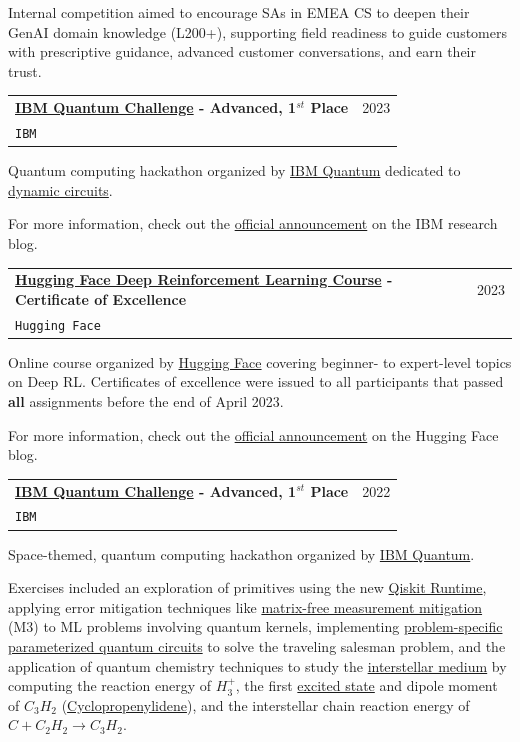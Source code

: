 \documentclass[letterpaper,11pt]{article}
\makeatletter
\newcommand{\resumeSubheading}[4]{
  \vspace{-2pt}\item
    \begin{tabular*}{0.97\textwidth}[t]{l@{\extracolsep{\fill}}r}
      \textbf{#1} & #2 \\
      \texttt{\small#3} & \textit{\small #4} \\
    \end{tabular*}\vspace{-7pt}
}
\makeatother
\begin{document}
    Internal competition aimed to encourage SAs in EMEA CS to deepen their GenAI domain knowledge (L200+), supporting field readiness to guide customers with prescriptive guidance, advanced customer conversations, and earn their trust.
    \vspace{2mm}
    \resumeSubheading
      {\href{https://research.ibm.com/blog/quantum-challenge-spring-2023}{IBM Quantum Challenge} - Advanced, 1$^{st}$ Place}{2023}
      {IBM}{}
    \vspace{3mm}
    
    Quantum computing hackathon organized by \href{https://quantum-computing.ibm.com/}{IBM Quantum} dedicated to \href{https://quantum-computing.ibm.com/services/programs/docs/runtime/manage/systems/dynamic-circuits/Introduction-To-Dynamic-Circuits}{dynamic circuits}.
    
    For more information, check out the \href{https://research.ibm.com/blog/quantum-challenge-spring-2023}{official announcement} on the IBM research blog.
    \vspace{2mm}
    \resumeSubheading
      {\href{https://simoninithomas.github.io/deep-rl-course/}{Hugging Face \emoji{hugging-face} Deep Reinforcement Learning Course} - Certificate of Excellence}{2023}
      {Hugging Face}{}
    \vspace{3mm}

    Online course organized by \href{https://huggingface.co/}{Hugging Face} covering beginner- to expert-level topics on Deep RL. Certificates of excellence were issued to all participants that passed \textbf{all} assignments before the end of April 2023.
    
    For more information, check out the \href{https://huggingface.co/blog/deep-rl-intro}{official announcement} on the Hugging Face  blog.
    \vspace{2mm}
    \resumeSubheading
      {\href{https://research.ibm.com/blog/quantum-challenge-fall-2022}{IBM Quantum Challenge} - Advanced, 1$^{st}$ Place}{2022}
      {IBM}{}
    \vspace{3mm}
    
    Space-themed, quantum computing hackathon organized by \href{https://quantum-computing.ibm.com/}{IBM Quantum}.
    
    Exercises included an exploration of primitives using the new \href{https://qiskit.org/documentation/partners/qiskit_ibm_runtime/}{Qiskit Runtime}, applying error mitigation techniques like \href{https://github.com/Qiskit-Partners/mthree}{matrix-free measurement mitigation} (M3) to ML problems involving quantum kernels, implementing \href{https://arxiv.org/abs/2006.05643}{problem-specific parameterized quantum circuits} to solve the traveling salesman problem, and the application of quantum chemistry techniques to study the \href{https://pubs.rsc.org/en/content/chapterhtml/2017/bk9781782627760-00001?isbn=978-1-78262-776-0}{interstellar medium} by computing the reaction energy of $H^+_3$, the first \href{https://arxiv.org/abs/1805.08138}{excited state} and dipole moment of $C_3 H_2$ (\href{https://pubmed.ncbi.nlm.nih.gov/11542419/}{Cyclopropenylidene}), and the interstellar chain reaction energy of \href{https://pubs.acs.org/doi/10.1021/jp020310z}{$C + C_2 H_2 \rightarrow C_3 H_2$}.
    
\end{document}
